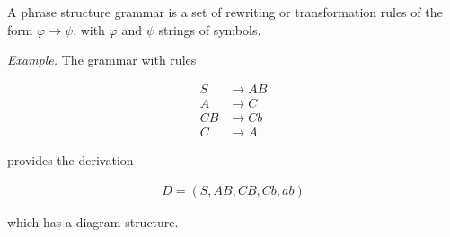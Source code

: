\documentclass[a4paper, 12pt]{article}
\begin{document}
A phrase structure grammar is a set of rewriting or transformation rules of the
form $\varphi \to  \psi$, with $\varphi$ and $\psi$ strings of symbols.

\textit{Example.} The grammar with rules 

\begin{align*}
    S &\to AB \\ 
    A &\to C \\ 
    CB&\to Cb \\ 
    C &\to A
\end{align*}

provides the derivation 

\begin{align*}
    D = (S, AB, CB, Cb, ab)
\end{align*}

which has a diagram structure.
\end{document}
